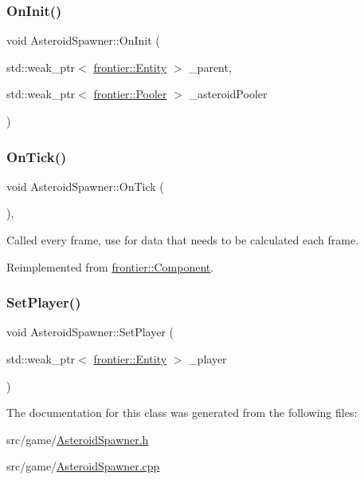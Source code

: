 \subsubsection{\texorpdfstring{On\+Init()}{OnInit()}}
{\footnotesize\ttfamily void Asteroid\+Spawner\+::\+On\+Init (\begin{DoxyParamCaption}\item[{std\+::weak\+\_\+ptr$<$ \hyperlink{classfrontier_1_1_entity}{frontier\+::\+Entity} $>$}]{\+\_\+parent,  }\item[{std\+::weak\+\_\+ptr$<$ \hyperlink{classfrontier_1_1_pooler}{frontier\+::\+Pooler} $>$}]{\+\_\+asteroid\+Pooler }\end{DoxyParamCaption})}

\mbox{\label{class_asteroid_spawner_acd2744a9a1ac8f13ac28220b33b9f750}} 
\subsubsection{\texorpdfstring{On\+Tick()}{OnTick()}}
{\footnotesize\ttfamily void Asteroid\+Spawner\+::\+On\+Tick (\begin{DoxyParamCaption}{ }\end{DoxyParamCaption})\hspace{0.3cm}{\ttfamily [override]}, {\ttfamily [virtual]}}



Called every frame, use for data that needs to be calculated each frame. 



Reimplemented from \hyperlink{classfrontier_1_1_component_ab920f9bc07ce051ebb5559c5a66508d1}{frontier\+::\+Component}.

\mbox{\label{class_asteroid_spawner_a4ba8146f631d20b3f293f05cb6542da5}} 
\subsubsection{\texorpdfstring{Set\+Player()}{SetPlayer()}}
{\footnotesize\ttfamily void Asteroid\+Spawner\+::\+Set\+Player (\begin{DoxyParamCaption}\item[{std\+::weak\+\_\+ptr$<$ \hyperlink{classfrontier_1_1_entity}{frontier\+::\+Entity} $>$}]{\+\_\+player }\end{DoxyParamCaption})}



The documentation for this class was generated from the following files\+:\begin{DoxyCompactItemize}
\item 
src/game/\hyperlink{_asteroid_spawner_8h}{Asteroid\+Spawner.\+h}\item 
src/game/\hyperlink{_asteroid_spawner_8cpp}{Asteroid\+Spawner.\+cpp}\end{DoxyCompactItemize}
